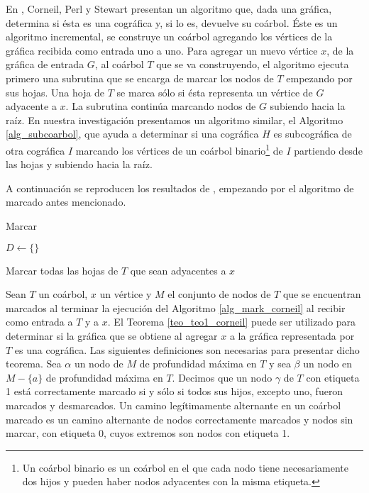 En \cite{Corneil02}, Corneil, Perl y Stewart presentan un algoritmo
que, dada una gráfica, determina si ésta es una cográfica y, si lo
es, devuelve su coárbol. Éste es un algoritmo incremental, se
construye un coárbol agregando los vértices de la gráfica recibida
como entrada uno a uno. Para agregar un nuevo vértice $x$, de la
gráfica de entrada $G$, al coárbol $T$ que se va construyendo, el
algoritmo ejecuta primero una subrutina que se encarga de marcar los
nodos de $T$ empezando por sus hojas. Una hoja de $T$ se marca sólo
si ésta representa un vértice de $G$ adyacente a $x$. La subrutina
continúa marcando nodos de $G$ subiendo hacia la raíz. En nuestra
investigación presentamos un algoritmo similar, el Algoritmo
\ref{alg_subcoarbol}, que ayuda a determinar si una cográfica
$H$ es subcográfica de otra cográfica $I$ marcando los vértices de
un coárbol binario\footnote{Un coárbol binario es un coárbol en el
que cada nodo tiene necesariamente dos hijos y pueden haber nodos
adyacentes con la misma etiqueta.} de $I$ partiendo desde las hojas
y subiendo hacia la raíz.

A continuación se reproducen los resultados de \cite{ Corneil02},
empezando por el algoritmo de marcado antes mencionado.

\begin{algorithm}[!htbp]
\caption{Marcar}
\label{alg_mark_corneil}
\DontPrintSemicolon %

$D\gets \{\}$  \; 

Marcar todas las hojas de $T$ que sean adyacentes a $x$\;


\end{algorithm}

Sean $T$ un coárbol, $x$ un vértice y $M$ el conjunto de nodos
de $T$ que se encuentran marcados al terminar la ejecución del
Algoritmo \ref{alg_mark_corneil} al recibir como entrada a $T$
y a $x$. El Teorema \ref{teo_teo1_corneil} puede ser utilizado
para determinar si la gráfica que se obtiene al agregar $x$ a
la gráfica representada por $T$ es una cográfica.
Las siguientes definiciones son necesarias para presentar dicho
teorema. Sea $\alpha$ un nodo de $M$ de profundidad máxima en $T$
y sea $\beta$ un nodo en $M-\{a\}$ de profundidad máxima en $T$.
Decimos que un nodo $\gamma$ de $T$ con etiqueta 1 está
correctamente marcado si y sólo si todos sus hijos, excepto uno,
fueron marcados y desmarcados. Un camino legítimamente alternante
en un coárbol marcado es un camino alternante de nodos correctamente
marcados y nodos sin marcar, con etiqueta 0, cuyos extremos son nodos
con etiqueta 1.


